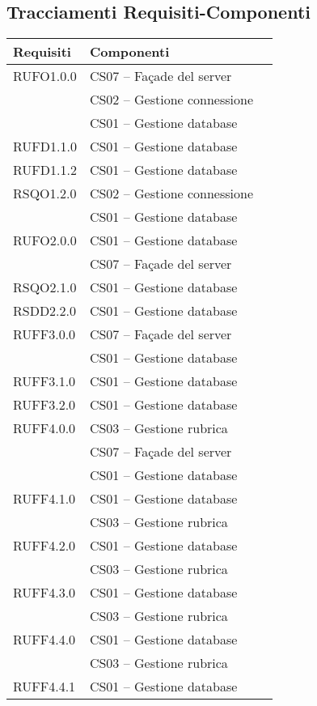 \subsection{Tracciamenti Requisiti-Componenti}\label{sec:tracRecComp}

\begin{center}
\begin{longtable}{lp{}l}
\toprule Requisiti &  Componenti\\
\midrule
RUFO1.0.0 & CS07 -- Façade del server \\
 & CS02 -- Gestione connessione \\
 & CS01 -- Gestione database \\
RUFD1.1.0 & CS01 -- Gestione database \\
RUFD1.1.2 & CS01 -- Gestione database \\
RSQO1.2.0 & CS02 -- Gestione connessione \\
 & CS01 -- Gestione database \\
RUFO2.0.0 & CS01 -- Gestione database \\
 & CS07 -- Façade del server \\
RSQO2.1.0 & CS01 -- Gestione database \\
RSDD2.2.0 & CS01 -- Gestione database \\
RUFF3.0.0 & CS07 -- Façade del server \\
 & CS01 -- Gestione database \\
RUFF3.1.0 & CS01 -- Gestione database \\
RUFF3.2.0 & CS01 -- Gestione database \\
RUFF4.0.0 & CS03 -- Gestione rubrica \\
 & CS07 -- Façade del server \\
 & CS01 -- Gestione database \\
RUFF4.1.0 & CS01 -- Gestione database \\
 & CS03 -- Gestione rubrica \\
RUFF4.2.0 & CS01 -- Gestione database \\
 & CS03 -- Gestione rubrica \\
RUFF4.3.0 & CS01 -- Gestione database \\
 & CS03 -- Gestione rubrica \\
RUFF4.4.0 & CS01 -- Gestione database \\
 & CS03 -- Gestione rubrica \\
RUFF4.4.1 & CS01 -- Gestione database \\

\end{longtable}
\end{center}
